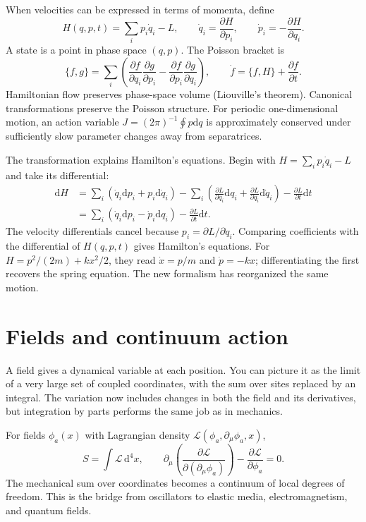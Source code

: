 \documentclass[11pt,oneside]{book}
\newcommand{\dd}{\mathrm{d}}
\newcommand{\pd}[2]{\frac{\partial #1}{\partial #2}}
\theoremstyle{reviewstyle}
\begin{document}
When velocities can be expressed in terms of momenta, define
\begin{equation}
H(q,p,t)=\sum_i p_i\dot q_i-L,
\qquad \dot q_i=\pd{H}{p_i},\qquad \dot p_i=-\pd{H}{q_i}.
\end{equation}
A state is a point in phase space $(q,p)$. The Poisson bracket is
\begin{equation}
\{f,g\}=\sum_i\left(\pd{f}{q_i}\pd{g}{p_i}-\pd{f}{p_i}\pd{g}{q_i}\right),\qquad
\dot f=\{f,H\}+\pd{f}{t}.
\end{equation}
Hamiltonian flow preserves phase-space volume (Liouville's theorem). Canonical transformations preserve the Poisson structure. For periodic one-dimensional motion, an action variable $J=(2\pi)^{-1}\oint p\dd q$ is approximately conserved under sufficiently slow parameter changes away from separatrices.

The transformation explains Hamilton's equations. Begin with $H=\sum_i p_i\dot q_i-L$ and take its differential:
\begin{align}
\dd H&=\sum_i(\dot q_i\dd p_i+p_i\dd\dot q_i)
-\sum_i\left(\pd L{q_i}\dd q_i+\pd L{\dot q_i}\dd\dot q_i\right)-\pd Lt\dd t\\
&=\sum_i(\dot q_i\dd p_i-\dot p_i\dd q_i)-\pd Lt\dd t.
\end{align}
The velocity differentials cancel because $p_i=\partial L/\partial\dot q_i$. Comparing coefficients with the differential of $H(q,p,t)$ gives Hamilton's equations. For $H=p^2/(2m)+kx^2/2$, they read $\dot x=p/m$ and $\dot p=-kx$; differentiating the first recovers the spring equation. The new formalism has reorganized the same motion.

\section{Fields and continuum action}
A field gives a dynamical variable at each position. You can picture it as the limit of a very large set of coupled coordinates, with the sum over sites replaced by an integral. The variation now includes changes in both the field and its derivatives, but integration by parts performs the same job as in mechanics.

For fields $\phi_a(x)$ with Lagrangian density $\mathcal L(\phi_a,\partial_\mu\phi_a,x)$,
\begin{equation}
S=\int\mathcal L\,\dd^4x,\qquad
\partial_\mu\left(\pd{\mathcal L}{(\partial_\mu\phi_a)}\right)-\pd{\mathcal L}{\phi_a}=0.
\end{equation}
The mechanical sum over coordinates becomes a continuum of local degrees of freedom. This is the bridge from oscillators to elastic media, electromagnetism, and quantum fields.
\end{document}
